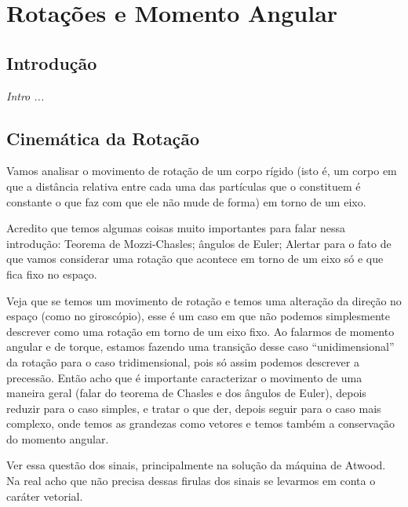 \chapter{Rotações e Momento Angular}\label{Chap:Rotacoes}



\section{Introdução}

{\it
Intro ...
}

\section{Cinemática da Rotação}

Vamos analisar o movimento de rotação de um corpo rígido (isto é, um corpo em que a distância relativa entre cada uma das partículas que o constituem é constante o que faz com que ele não mude de forma) em torno de um eixo.

Acredito que temos algumas coisas muito importantes para falar nessa introdução: Teorema de Mozzi-Chasles; ângulos de Euler; Alertar para o fato de que vamos considerar uma rotação que acontece em torno de um eixo só e que fica fixo no espaço.

Veja que se temos um movimento de rotação e temos uma alteração da direção no espaço (como no giroscópio), esse é um caso em que não podemos simplesmente descrever como uma rotação em torno de um eixo fixo. Ao falarmos de momento angular e de torque, estamos fazendo uma transição desse caso ``unidimensional'' da rotação para o caso tridimensional, pois só assim podemos descrever a precessão. Então acho que é importante caracterizar o movimento de uma maneira geral (falar do teorema de Chasles e dos ângulos de Euler), depois reduzir para o caso simples, e tratar o que der, depois seguir para o caso mais complexo, onde temos as grandezas como vetores e temos também a conservação do momento angular.


Ver essa questão dos sinais, principalmente na solução da máquina de Atwood. Na real acho que não precisa dessas firulas dos sinais se levarmos em conta o caráter vetorial.

